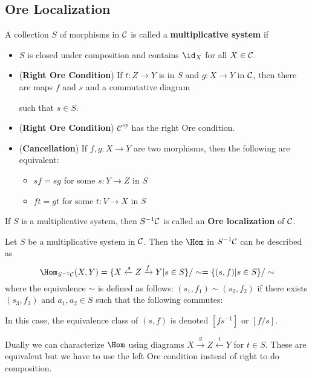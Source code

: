 \documentclass[12pt]{article}
\begin{document}
\subsection{Ore Localization}
\begin{defn}
	A collection $S$ of morphisms in $\cal C$ is called a \textbf{multiplicative system} 
	if
	\begin{itemize}
		\item $S$ is closed under composition and contains $\id_X$ for all $X\in\cal C$.
		\item (\textbf{Right Ore Condition}) If $t:Z\to Y$ is in $S$ and $g:X\to Y$ in $\cal C$,
		then there are maps $f$ and $s$ and a commutative diagram
		\begin{center}
		\end{center}
		such that $s\in S$.
		\item (\textbf{Right Ore Condition}) $\mathcal{C}^{op}$ has the right Ore condition.
		\item (\textbf{Cancellation}) If $f,g:X\to Y$ are two morphisms, then the following are equivalent:
		\begin{itemize}
			\item $sf=sg$ for some $s:Y\to Z$ in $S$
			\item $ft=gt$ for some $t:V\to X$ in $S$
		\end{itemize}
	\end{itemize}
\end{defn}
\begin{defn}
	If $S$ is a multiplicative system, then $S^{-1}\cal C$ is called an \textbf{Ore localization} of $\cal C$.
\end{defn}
\begin{thm}
	Let $S$ be a multiplicative system in $\cal C$. Then the $\Hom$ in $S^{-1}\cal C$ can be described 
	as
	\[\Hom_{S^{-1}\cal C}(X,Y)=\{X\xleftarrow{s}Z\xrightarrow{f}Y| s\in S\}/\sim=\{(s,f)|s\in S\}/\sim\]
	where the equivalence $\sim$ is defined as follows: $(s_1,f_1)\sim(s_2,f_2)$ if there exists $(s_3,f_3)$
	and $a_1,a_2\in S$ such that the following commutes:
	\begin{center}
	\end{center}
	In this case, the equivalence class of $(s,f)$ is denoted $[fs^{-1}]$ or $[f/s]$.
\end{thm}
\begin{rmk}
	Dually we can characterize $\Hom$ using diagrams $X\xrightarrow{g} Z\xleftarrow{t} Y$ for $t\in S$. These are
	equivalent but we have to use the left Ore condition instead of right to do composition.
\end{rmk}
\end{document}

